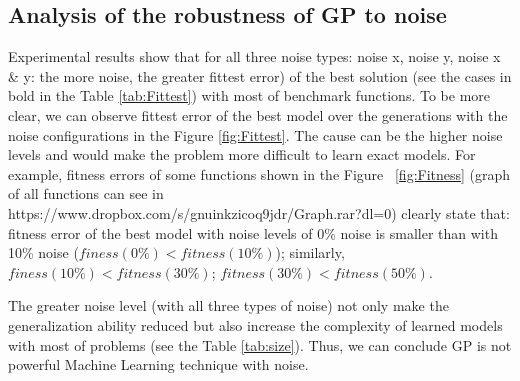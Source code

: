 \subsection {Analysis of the robustness of GP to noise}
\label{AnaFittest}
Experimental results show that for all three noise types: noise x, noise y, noise x \& y: the more noise, the greater fittest error) of the best solution (see the cases in bold in the Table \ref{tab:Fittest}) with most of benchmark functions. To be more clear, we can observe fittest error of the best model over the generations with the noise configurations in the Figure \ref{fig:Fittest}. The cause can be the higher noise levels and would make the problem more difficult to learn exact models. For example, fitness errors of some functions shown in the Figure ~\ref{fig:Fitness} (graph of all functions can see in https://www.dropbox.com/s/gnuinkzicoq9jdr/Graph.rar?dl=0) clearly state that: fitness error of the best model with noise levels of 0\% noise is smaller than with 10\% noise ($finess(0 \%) < fitness(10\%)$); similarly, $finess(10\%) < fitness(30\%)$; $fitness(30\%) < fitness(50\%)$. \par
The greater noise level (with all three types of noise) not only make the generalization ability reduced but also increase the complexity of learned models with most of problems (see the Table \ref{tab:size}). Thus, we can conclude GP is not powerful Machine Learning technique with noise.
